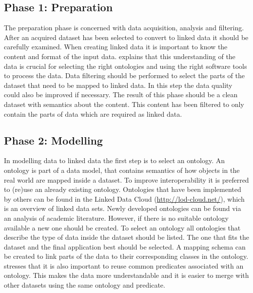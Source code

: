 \subsection{Phase 1: Preparation}
The preparation phase is concerned with data acquisition, analysis and filtering. After an acquired dataset has been selected to convert to linked data it should be carefully examined. When creating linked data it is important to know the content and format of the input data. \cite{LD:Missier} explains that this understanding of the data is crucial for selecting the right ontologies and using the right software tools to process the data. Data filtering should be performed to select the parts of the dataset that need to be mapped to linked data. In this step the data quality could also be improved if necessary. The result of this phase should be a clean dataset with semantics about the content. This content has been filtered to only contain the parts of data which are required as linked data. 
 
\subsection{Phase 2: Modelling}
In modelling data to linked data the first step is to select an ontology. An ontology is part of a data model, that contains semantics of how objects in the real world are mapped inside a dataset. To improve interoperability it is preferred to (re)use an already existing ontology. Ontologies that have been implemented by others can be found in the Linked Data Cloud (\url{http://lod-cloud.net/}), which is an overview of linked data sets. Newly developed ontologies can be found via an analysis of academic literature. However, if there is no suitable ontology available a new one should be created. To select an ontology all ontologies that describe the type of data inside the dataset should be listed. The one that fits the dataset and the final application best should be selected. A mapping schema can be created to link parts of the data to their corresponding classes in the ontology. \cite{LD:Missier} stresses that it is also important to reuse common predicates associated with an ontology. This makes the data more understandable and it is easier to merge with other datasets using the same ontology and predicate. 

